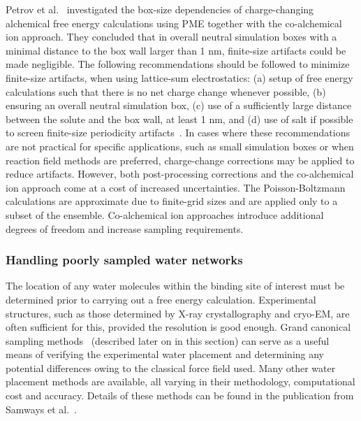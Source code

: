 \documentclass[9pt,bestpractices]{livecoms}
\begin{document}
Petrov et al.~\cite{Petrov2024guidelines} investigated the box-size dependencies of charge-changing alchemical free energy calculations using PME together with the co-alchemical ion approach. They concluded that in overall neutral simulation boxes with a minimal distance to the box wall larger than 1 nm, finite-size artifacts could be made negligible. The following recommendations should be followed to minimize finite-size artifacts, when using lattice-sum electrostatics: (a) setup of free energy calculations such that there is no net charge change whenever possible, (b) ensuring an overall neutral simulation box, (c) use of a sufficiently large distance between the solute and the box wall, at least 1 nm, and (d) use of salt if possible to screen finite-size periodicity artifacts~\cite{chen2018accurate}. In cases where these recommendations are not practical for specific applications, such as small simulation boxes or when reaction field methods are preferred, charge-change corrections may be applied to reduce artifacts. However, both post-processing corrections and the co-alchemical ion approach come at a cost of increased uncertainties. The Poisson-Boltzmann calculations are approximate due to finite-grid sizes and are applied only to a subset of the ensemble. Co-alchemical ion approaches introduce additional degrees of freedom and increase sampling requirements.

\subsubsection{Handling poorly sampled water networks}
\label{sec:water_sampling}
The location of any water molecules within the binding site of interest must be determined prior to carrying out a free energy calculation. Experimental structures, such as those determined by X-ray crystallography and cryo-EM, are often sufficient for this, provided the resolution is good enough. Grand canonical sampling methods~\cite{melling2023enhanced, samways2020grand} (described later on in this section) can serve as a useful means of verifying the experimental water placement and determining any potential differences owing to the classical force field used. Many other water placement methods are available, all varying in their methodology, computational cost and accuracy. Details of these methods can be found in the publication from Samways et al.~\cite{samways2021water}.
\end{document}
